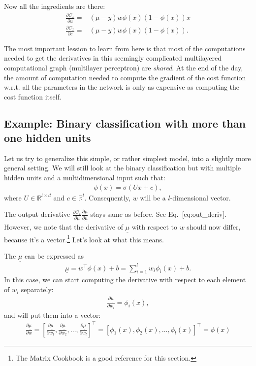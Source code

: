 \documentclass{report}
\newcommand{\RR}[0]{\mathbb{R}}
\begin{document}
Now all the ingredients are there:
\begin{align*}
    \frac{\partial C_x}{\partial u} =& (\mu -y) w \phi(x) (1-\phi(x)) x \\
    \frac{\partial C_x}{\partial c} =& (\mu -y) w \phi(x) (1-\phi(x)).
\end{align*}

The most important lession to learn from here is that most of the computations
needed to get the derivatives in this seemingly complicated multilayered
computational graph (multilayer perceptron) are {\em shared}. At the end of the
day, the amount of computation needed to compute the gradient of the cost
function w.r.t. all the parameters in the network is only as expensive as
computing the cost function itself.

\subsection{Example: Binary classification with more than one hidden units}
\label{sec:example2}

Let us try to generalize this simple, or rather simplest model, into a slightly
more general setting. We will still look at the binary classification but with
multiple hidden units and a multidimensional input such that:
\begin{align*}
    \phi(x) = \sigma(U x + c),
\end{align*}
where $U \in \RR^{l \times d}$ and $c \in \RR^l$. Consequently, $w$ will be a
$l$-dimensional vector.

The output derivative $\frac{\partial C_x}{\partial \mu}\frac{\partial
\mu}{\partial \underline{\mu}}$ stays same as before. See
Eq.~\eqref{eq:out_deriv}.
However, we note that the derivative of $\underline{\mu}$ with respect to $w$
should now differ, because it's a vector.\footnote{
    The Matrix Cookbook \cite{petersen2008matrix} is a good reference for this
    section.
}
Let's look at what this means.

The $\underline{\mu}$ can be expressed as
\begin{align}
    \label{eq:mu_vec}
    \underline{\mu} = w^\top \phi(x) + b = \sum_{i=1}^l w_i \phi_i(x) + b.
\end{align}
In this case, we can start computing the derivative with respect to each element
of $w_i$ separately:
\begin{align*}
    \frac{\partial \underline{\mu}}{\partial w_i} = \phi_i(x),
\end{align*}
and will put them into a vector:
\begin{align*}
    \frac{\partial \underline{\mu}}{\partial w} = \left[ 
        \frac{\partial \underline{\mu}}{\partial w_1}, \frac{\partial
        \underline{\mu}}{\partial w_2}, \ldots, \frac{\partial
        \underline{\mu}}{\partial w_l}
    \right]^\top = \left[ \phi_1(x), \phi_2(x), \ldots, \phi_l(x) \right]^\top
    = \phi(x)
\end{align*}
\end{document}
